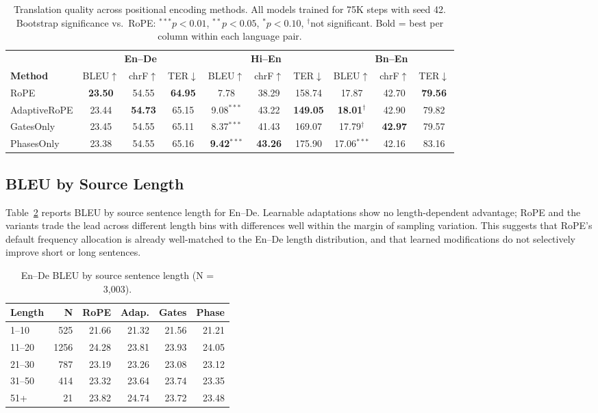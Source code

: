 \documentclass[conference]{IEEEtran}
\begin{document}
\begin{table}[t]
\centering
\small
\caption{Translation quality across positional encoding methods.
All models trained for 75K steps with seed 42.
Bootstrap significance vs.~RoPE: $^{***}p<0.01$, $^{**}p<0.05$, $^{*}p<0.10$,
$^{\dagger}$not significant. Bold = best per column within each language pair.
\label{tab:main}}
\begin{tabular}{l|ccc|ccc|ccc}
\toprule
& \multicolumn{3}{c|}{\textbf{En--De}}
& \multicolumn{3}{c|}{\textbf{Hi--En}}
& \multicolumn{3}{c}{\textbf{Bn--En}}
\\
\textbf{Method} & BLEU$\uparrow$ & chrF$\uparrow$ & TER$\downarrow$
& BLEU$\uparrow$ & chrF$\uparrow$ & TER$\downarrow$
& BLEU$\uparrow$ & chrF$\uparrow$ & TER$\downarrow$ \\
\midrule
RoPE & \textbf{23.50} & 54.55 & \textbf{64.95}
& 7.78 & 38.29 & 158.74
& 17.87 & 42.70 & \textbf{79.56} \\
AdaptiveRoPE & 23.44 & \textbf{54.73} & 65.15
& 9.08$^{***}$ & 43.22 & \textbf{149.05}
& \textbf{18.01}$^{\dagger}$ & 42.90 & 79.82 \\
GatesOnly & 23.45 & 54.55 & 65.11
& 8.37$^{***}$ & 41.43 & 169.07
& 17.79$^{\dagger}$ & \textbf{42.97} & 79.57 \\
PhasesOnly & 23.38 & 54.55 & 65.16
& \textbf{9.42}$^{***}$ & \textbf{43.26} & 175.90
& 17.06$^{***}$ & 42.16 & 83.16 \\
\bottomrule
\end{tabular}
\end{table}

\subsection{BLEU by Source Length}
\label{sec:length}

Table~\ref{tab:length} reports BLEU by source sentence length for En--De.
Learnable adaptations show no length-dependent advantage; RoPE and the
variants trade the lead across different length bins with differences well
within the margin of sampling variation. This suggests that RoPE's default
frequency allocation is already well-matched to the En--De length
distribution, and that learned modifications do not selectively improve
short or long sentences.

\begin{table}[t]
\centering
\small
\caption{En--De BLEU by source sentence length (N = 3,003).
\label{tab:length}}
\begin{tabular}{lrrrrr}
\toprule
\textbf{Length} & \textbf{N} & \textbf{RoPE} & \textbf{Adap.} & \textbf{Gates} & \textbf{Phase} \\
\midrule
1--10   & 525  & 21.66 & 21.32 & 21.56 & 21.21 \\
11--20  & 1256 & 24.28 & 23.81 & 23.93 & 24.05 \\
21--30  & 787  & 23.19 & 23.26 & 23.08 & 23.12 \\
31--50  & 414  & 23.32 & 23.64 & 23.74 & 23.35 \\
51+     & 21   & 23.82 & 24.74 & 23.72 & 23.48 \\
\bottomrule
\end{tabular}
\end{table}
\end{document}
